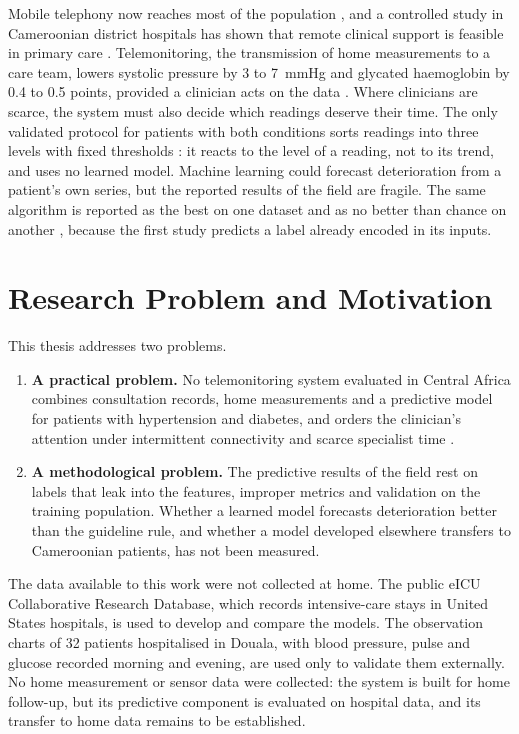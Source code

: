 \documentclass[11pt,a4paper,oneside]{report}
\begin{document}
Mobile telephony now reaches most of the population \parencite{segun2025}, and a controlled study in Cameroonian district hospitals has shown that remote clinical support is feasible in primary care \parencite{bediang2021}. Telemonitoring, the transmission of home measurements to a care team, lowers systolic pressure by 3 to 7~mmHg and glycated haemoglobin by 0.4 to 0.5 points, provided a clinician acts on the data \parencite{mao2020,mihevc2025}. Where clinicians are scarce, the system must also decide which readings deserve their time. The only validated protocol for patients with both conditions sorts readings into three levels with fixed thresholds \parencite{mihevc2025}: it reacts to the level of a reading, not to its trend, and uses no learned model. Machine learning could forecast deterioration from a patient's own series, but the reported results of the field are fragile. The same algorithm is reported as the best on one dataset \parencite{efendi2025} and as no better than chance on another \parencite{mendoza2025}, because the first study predicts a label already encoded in its inputs.

\section*{Research Problem and Motivation}

This thesis addresses two problems.
\begin{enumerate}
  \item \textbf{A practical problem.} No telemonitoring system evaluated in Central Africa combines consultation records, home measurements and a predictive model for patients with hypertension and diabetes, and orders the clinician's attention under intermittent connectivity and scarce specialist time \parencite{dodoo2022,agbeyangi2025}.
  \item \textbf{A methodological problem.} The predictive results of the field rest on labels that leak into the features, improper metrics and validation on the training population. Whether a learned model forecasts deterioration better than the guideline rule, and whether a model developed elsewhere transfers to Cameroonian patients, has not been measured.
\end{enumerate}

The data available to this work were not collected at home. The public eICU Collaborative Research Database, which records intensive-care stays in United States hospitals, is used to develop and compare the models. The observation charts of 32 patients hospitalised in Douala, with blood pressure, pulse and glucose recorded morning and evening, are used only to validate them externally. No home measurement or sensor data were collected: the system is built for home follow-up, but its predictive component is evaluated on hospital data, and its transfer to home data remains to be established.
\end{document}
